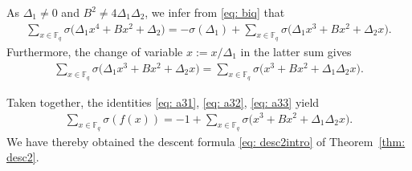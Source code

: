 \documentclass[11pt]{amsart}
\newcommand{\F}{\mathbb{F}}
\newcommand{\Fq}{\F_{\!q}}
\theoremstyle{definition}
\begin{document}
As $\Delta_1\neq 0$ and $B^2\neq 4\Delta_1\Delta_2$, we infer from \eqref{eq: biq} that 
\begin{align}\label{eq: a32}
\sum_{x\in \Fq} \sigma\big(\Delta_1x^4+Bx^2+\Delta_2\big)=-\sigma(\Delta_1)+\sum_{x\in \Fq} \sigma\big(\Delta_1x^3+Bx^2+\Delta_2x\big).
\end{align}
Furthermore, the change of variable $x:=x/\Delta_1$ in the latter sum gives
\begin{align}\label{eq: a33}
\sum_{x\in \Fq} \sigma\big(\Delta_1x^3+Bx^2+\Delta_2x\big)=\sum_{x\in \Fq} \sigma\big(x^3+Bx^2+\Delta_1\Delta_2x\big).
\end{align}

Taken together, the identities \eqref{eq: a31}, \eqref{eq: a32}, \eqref{eq: a33} yield
\begin{align*}
\sum_{x\in \Fq} \sigma(f(x))=-1+\sum_{x\in \Fq} \sigma\big(x^3+Bx^2+\Delta_1\Delta_2x\big).
\end{align*}
We have thereby obtained the descent formula \eqref{eq: desc2intro} of Theorem~\ref{thm: desc2}.
\end{document}
